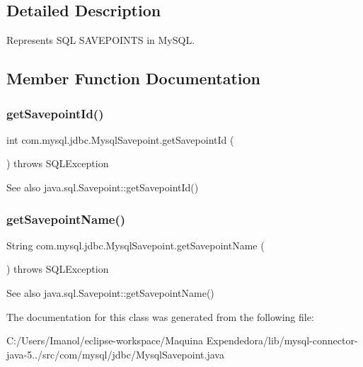 \subsection{Detailed Description}
Represents S\+QL S\+A\+V\+E\+P\+O\+I\+N\+TS in My\+S\+QL. 

\subsection{Member Function Documentation}
\mbox{\label{classcom_1_1mysql_1_1jdbc_1_1_mysql_savepoint_abebfdcf4d5b67888ecec86230c7104cc}} 
\subsubsection{\texorpdfstring{get\+Savepoint\+Id()}{getSavepointId()}}
{\footnotesize\ttfamily int com.\+mysql.\+jdbc.\+Mysql\+Savepoint.\+get\+Savepoint\+Id (\begin{DoxyParamCaption}{ }\end{DoxyParamCaption}) throws S\+Q\+L\+Exception}

\begin{DoxySeeAlso}{See also}
java.\+sql.\+Savepoint\+::get\+Savepoint\+Id() 
\end{DoxySeeAlso}
\mbox{\label{classcom_1_1mysql_1_1jdbc_1_1_mysql_savepoint_a78a27433692ef5fc878840e60172e91a}} 
\subsubsection{\texorpdfstring{get\+Savepoint\+Name()}{getSavepointName()}}
{\footnotesize\ttfamily String com.\+mysql.\+jdbc.\+Mysql\+Savepoint.\+get\+Savepoint\+Name (\begin{DoxyParamCaption}{ }\end{DoxyParamCaption}) throws S\+Q\+L\+Exception}

\begin{DoxySeeAlso}{See also}
java.\+sql.\+Savepoint\+::get\+Savepoint\+Name() 
\end{DoxySeeAlso}


The documentation for this class was generated from the following file\+:\begin{DoxyCompactItemize}
\item 
C\+:/\+Users/\+Imanol/eclipse-\/workspace/\+Maquina Expendedora/lib/mysql-\/connector-\/java-\/5../src/com/mysql/jdbc/Mysql\+Savepoint.\+java\end{DoxyCompactItemize}
